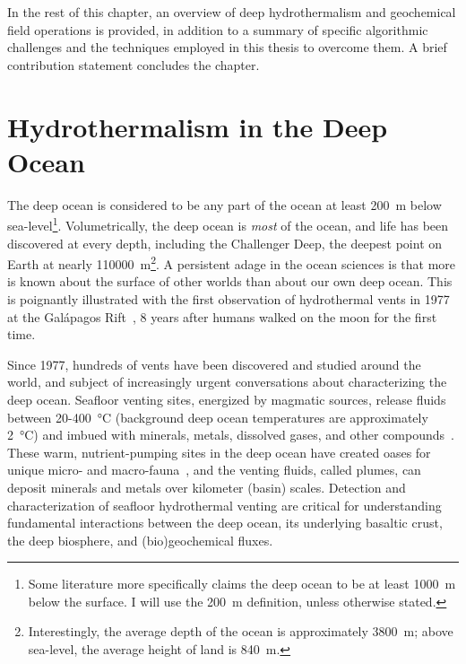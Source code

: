 In the rest of this chapter, an overview of deep hydrothermalism and geochemical field operations is provided, in addition to a summary of specific algorithmic challenges and the techniques employed in this thesis to overcome them.
A brief contribution statement concludes the chapter.



\section{Hydrothermalism in the Deep Ocean}
\label{sec:charting-plumes}
The deep ocean is considered to be any part of the ocean at least \SI{200}{\meter} below sea-level\footnote{Some literature more specifically claims the deep ocean to be at least \SI{1000}{\meter} below the surface. I will use the \SI{200}{\meter} definition, unless otherwise stated.}.
Volumetrically, the deep ocean is \emph{most} of the ocean, and life has been discovered at every depth, including the Challenger Deep, the deepest point on Earth at nearly \SI{110000}{\meter}\autocite{cario2019exploring}\footnote{Interestingly, the average depth of the ocean is approximately \SI{3800}{\meter}; above sea-level, the average height of land is \SI{840}{\meter}.}.
A persistent adage in the ocean sciences is that more is known about the surface of other worlds than about our own deep ocean.
This is poignantly illustrated with the first observation of hydrothermal vents in 1977 at the Galápagos Rift~\autocite{corliss1979submarine}, 8 years after humans walked on the moon for the first time.

Since 1977, hundreds of vents have been discovered and studied around the world\autocite{beaulieu2013authoritative}, and subject of increasingly urgent conversations about characterizing the deep ocean.
Seafloor venting sites, energized by magmatic sources, release fluids between 20-\SI{400}{\celsius} (background deep ocean temperatures are approximately \SI{2}{\celsius}) and imbued with minerals, metals, dissolved gases, and other compounds~\autocite{jannasch1985geomicrobiology, martin2008hydrothermal}.
These warm, nutrient-pumping sites in the deep ocean have created oases for unique micro- and macro-fauna~\autocite{corliss1979submarine}, and the venting fluids, called plumes, can deposit minerals and metals over kilometer (basin) scales\autocite{scholz2019shelf,resing2015basin,le2019hydrothermal}.
Detection and characterization of seafloor hydrothermal venting are critical for understanding fundamental interactions between the deep ocean, its underlying basaltic crust, the deep biosphere, and (bio)geochemical fluxes.

